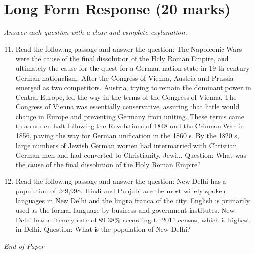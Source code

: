 \documentclass[12pt]{article}
\begin{document}
\section*{Long Form Response (20 marks)}
\textit{Answer each question with a clear and complete explanation.}
\begin{enumerate}[label=\arabic*.]
\setcounter{enumi}{10}
\item Read the following passage and answer the question: The Napoleonic Wars were the cause of the final dissolution of the Holy Roman Empire, and ultimately the cause for the quest for a German nation state in 19 th-century German nationalism. After the Congress of Vienna, Austria and Prussia emerged as two competitors. Austria, trying to remain the dominant power in Central Europe, led the way in the terms of the Congress of Vienna. The Congress of Vienna was essentially conservative, assuring that little would change in Europe and preventing Germany from uniting. These terms came to a sudden halt following the Revolutions of 1848 and the Crimean War in 1856, paving the way for German unification in the 1860 s. By the 1820 s, large numbers of Jewish German women had intermarried with Christian German men and had converted to Christianity. Jewi... Question: What was the cause of the final dissolution of the Holy Roman Empire?
\item Read the following passage and answer the question: New Delhi has a population of 249,998. Hindi and Punjabi are the most widely spoken languages in New Delhi and the lingua franca of the city. English is primarily used as the formal language by business and government institutes. New Delhi has a literacy rate of 89.38\% according to 2011 census, which is highest in Delhi. Question: What is the population of New Delhi?
\end{enumerate}

\vfill
\noindent\textit{End of Paper}
\end{document}
